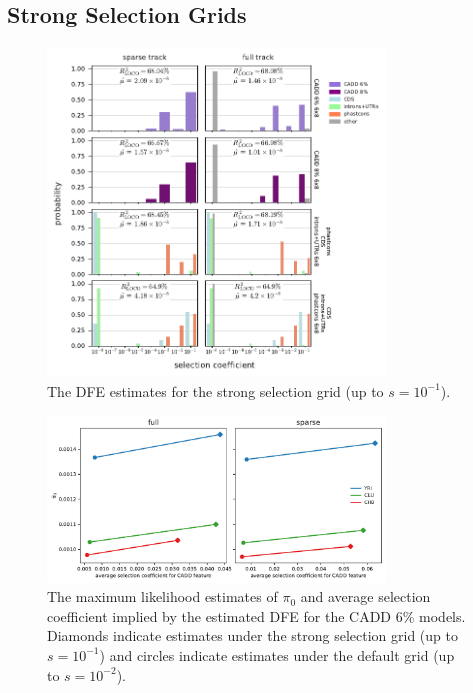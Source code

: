 \documentclass[11pt]{article}
\begin{document}
\subsection{Strong Selection Grids}
\label{supp:strong-sel-grid}

\begin{figure}[htbp]
  \centering
  \includegraphics[width=0.8\textwidth]{figures/supplementary/strongsel_grid_dfe.pdf}
  \caption{The DFE estimates for the strong selection grid (up to $s=10^{-1}$).}
    \label{suppfig:strong-sel-dfe}
\end{figure}



\begin{figure}[htbp]
  \centering
  \includegraphics[width=0.8\textwidth]{figures/supplementary/ave_sel_vs_pi0.pdf}

  \caption{The maximum likelihood estimates of $\pi_0$ and average selection
  coefficient implied by the estimated DFE for the CADD 6\% models. Diamonds
indicate estimates under the strong selection grid (up to $s=10^{-1}$) and
circles indicate estimates under the default grid (up to $s=10^{-2}$).}

    \label{suppfig:sel-ident}
\end{figure}
\end{document}
